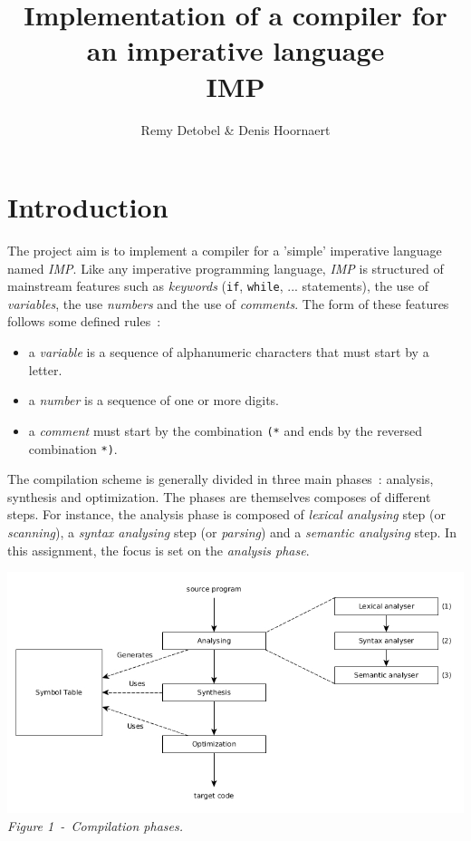 \documentclass[a4paper,11pt]{article}
\title{Implementation of a compiler for an imperative language\\IMP}
\author{Remy Detobel \& Denis Hoornaert}
\begin{document}
\maketitle

\section{Introduction}

  The project aim is to implement a compiler for a 'simple' imperative language named \textit{IMP}. Like any imperative programming language, \textit{IMP} is structured of mainstream features such as \textit{keywords} (\verb|if|, \verb|while|, ... statements), the use of \textit{variables}, the use \textit{numbers} and the use of \textit{comments}.
  The form of these features follows some defined rules~:
  \begin{itemize}
    \item a \textit{variable} is a sequence of alphanumeric characters that must start by a letter.
    \item a \textit{number} is a sequence of one or more digits.
    \item a \textit{comment} must start by the combination \verb|(*| and ends by the reversed combination \verb|*)|.
  \end{itemize}
  The compilation scheme is generally divided in three main phases~: analysis, synthesis and optimization. The phases are themselves composes of different steps. For instance, the analysis phase is composed of \textit{lexical analysing} step (or \textit{scanning}), a \textit{syntax analysing} step (or \textit{parsing}) and a \textit{semantic analysing} step. In this assignment, the focus is set on the \textit{analysis phase}.
  \begin{center}
    \includegraphics[scale=0.5]{./img/phase_of_compiler.jpg}\\
    \textit{Figure 1~-~Compilation phases.}
  \end{center}
  
\end{document}
